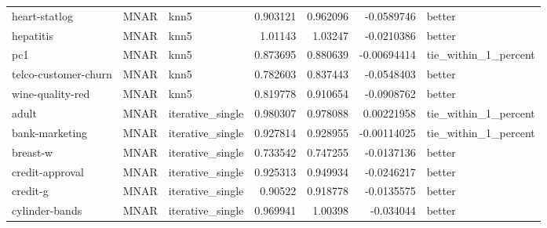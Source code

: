 \begin{table}[ht]
\begin{tabular}{lllrrrl}
 heart-statlog        & MNAR        & knn5             &                                 0.903121 &                             0.962096 &                    -0.0589746  & better               \\
 hepatitis            & MNAR        & knn5             &                                 1.01143  &                             1.03247  &                    -0.0210386  & better               \\
 pc1                  & MNAR        & knn5             &                                 0.873695 &                             0.880639 &                    -0.00694414 & tie\_within\_1\_percent \\
 telco-customer-churn & MNAR        & knn5             &                                 0.782603 &                             0.837443 &                    -0.0548403  & better               \\
 wine-quality-red     & MNAR        & knn5             &                                 0.819778 &                             0.910654 &                    -0.0908762  & better               \\
 adult                & MNAR        & iterative\_single &                                 0.980307 &                             0.978088 &                     0.00221958 & tie\_within\_1\_percent \\
 bank-marketing       & MNAR        & iterative\_single &                                 0.927814 &                             0.928955 &                    -0.00114025 & tie\_within\_1\_percent \\
 breast-w             & MNAR        & iterative\_single &                                 0.733542 &                             0.747255 &                    -0.0137136  & better               \\
 credit-approval      & MNAR        & iterative\_single &                                 0.925313 &                             0.949934 &                    -0.0246217  & better               \\
 credit-g             & MNAR        & iterative\_single &                                 0.90522  &                             0.918778 &                    -0.0135575  & better               \\
 cylinder-bands       & MNAR        & iterative\_single &                                 0.969941 &                             1.00398  &                    -0.034044   & better               \\

\end{tabular}
\end{table}
